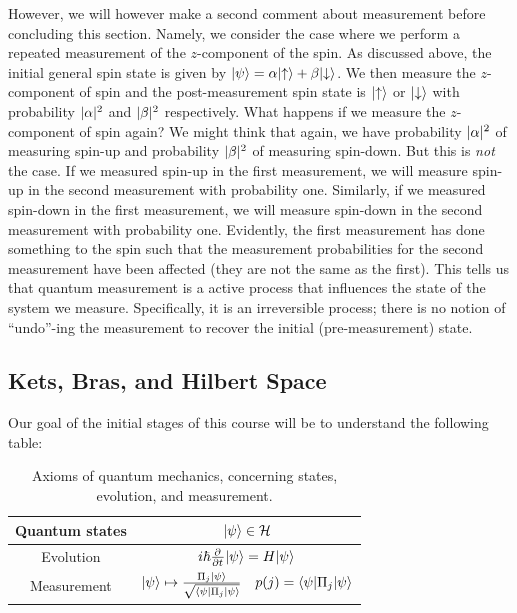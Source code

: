 However, we will however make a second comment about measurement before concluding this section. Namely, we consider the case where we perform a repeated measurement of the $z$-component of the spin. As discussed above, the initial general spin state is given by $\lvert \psi \rangle = \alpha\lvert \uparrow \rangle + \beta\lvert \downarrow \rangle$. We then measure the $z$-component of spin and the post-measurement spin state is $\lvert \uparrow \rangle$ or $\lvert \downarrow \rangle$ with probability $\lvert \alpha \rvert^2$ and $\lvert \beta \rvert^2$ respectively. What happens if we measure the $z$-component of spin again? We might think that again, we have probability $\lvert \alpha \rvert^2$ of measuring spin-up and probability $\lvert \beta \rvert^2$ of measuring spin-down. But this is \emph{not} the case. If we measured spin-up in the first measurement, we will measure spin-up in the second measurement with probability one. Similarly, if we measured spin-down in the first measurement, we will measure spin-down in the second measurement with probability one. Evidently, the first measurement has done something to the spin such that the measurement probabilities for the second measurement have been affected (they are not the same as the first). This tells us that quantum measurement is a active process that influences the state of the system we measure. Specifically, it is an irreversible process; there is no notion of ``undo''-ing the measurement to recover the initial (pre-measurement) state.


\subsection{Kets, Bras, and Hilbert Space}
Our goal of the initial stages of this course will be to understand the following table:

\begin{table}[htbp]
    \centering\begin{tabular}{|c|c|}
        \hline Quantum states & $\lvert \psi \rangle \in \mathcal{H}$ 
        \\ \hline Evolution & $i\hbar\pd{}{t}\ket{\psi} = H\ket{\psi}$
        \\ \hline Measurement & $\lvert \psi \rangle \mapsto \frac{\Pi_j \lvert \psi \rangle}{\sqrt{\langle \psi \rvert\Pi_j\lvert \psi \rangle}} \quad p(j) = \langle \psi \rvert\Pi_j\lvert \psi \rangle$
        \\ \hline
    \end{tabular}
    \caption{Axioms of quantum mechanics, concerning states, evolution, and measurement.}
    \label{table-QMaxioms}
\end{table}

